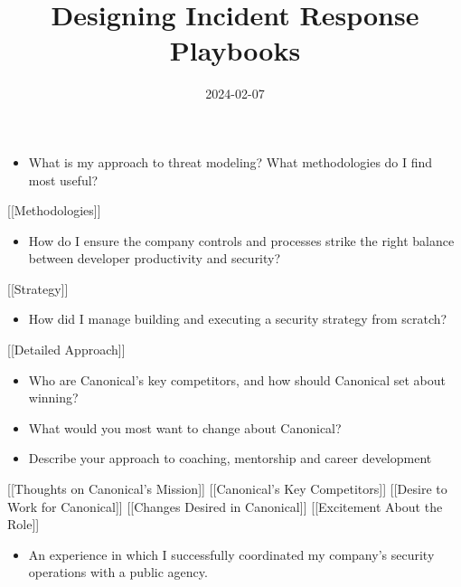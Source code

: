 \documentclass[
]{article}
\title{Designing Incident Response Playbooks}
\author{}
\date{2024-02-07}
\providecommand{\tightlist}{%
  \setlength{\itemsep}{0pt}\setlength{\parskip}{0pt}}
\begin{document}
\maketitle

\begin{itemize}
\tightlist
\item
  What is my approach to threat modeling? What methodologies do I find
  most useful?
\end{itemize}

{[}{[}Methodologies{]}{]}

\begin{itemize}
\tightlist
\item
  How do I ensure the company controls and processes strike the right
  balance between developer productivity and security?
\end{itemize}

{[}{[}Strategy{]}{]}

\begin{itemize}
\tightlist
\item
  How did I manage building and executing a security strategy from
  scratch?
\end{itemize}

{[}{[}Detailed Approach{]}{]}

\begin{itemize}
\tightlist
\item
  Who are Canonical's key competitors, and how should Canonical set
  about winning?
\end{itemize}

\begin{itemize}
\tightlist
\item
  What would you most want to change about Canonical?
\end{itemize}

\begin{itemize}
\tightlist
\item
  Describe your approach to coaching, mentorship and career development
\end{itemize}

{[}{[}Thoughts on Canonical's Mission{]}{]} {[}{[}Canonical's Key
Competitors{]}{]} {[}{[}Desire to Work for Canonical{]}{]} {[}{[}Changes
Desired in Canonical{]}{]} {[}{[}Excitement About the Role{]}{]}

\begin{itemize}
\tightlist
\item
  An experience in which I successfully coordinated my company's
  security operations with a public agency.
\end{itemize}
\end{document}
